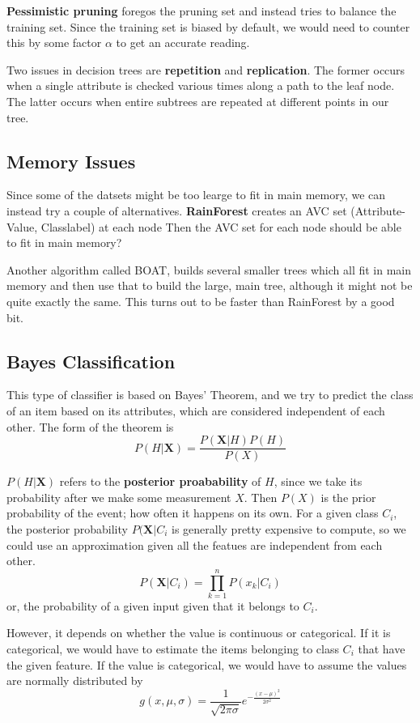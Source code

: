 \documentclass[
  paper=a4,
,captions=tableheading
]{scrartcl}
\begin{document}
\textbf{Pessimistic pruning} foregos the pruning set and instead tries
to balance the training set. Since the training set is biased by
default, we would need to counter this by some factor \(\alpha\) to get
an accurate reading.

Two issues in decision trees are \textbf{repetition} and
\textbf{replication}. The former occurs when a single attribute is
checked various times along a path to the leaf node. The latter occurs
when entire subtrees are repeated at different points in our tree.

\hypertarget{memory-issues}{%
\subsection{Memory Issues}\label{memory-issues}}

Since some of the datsets might be too learge to fit in main memory, we
can instead try a couple of alternatives. \textbf{RainForest} creates an
AVC set (Attribute-Value, Classlabel) at each node Then the AVC set for
each node should be able to fit in main memory?

Another algorithm called BOAT, builds several smaller trees which all
fit in main memory and then use that to build the large, main tree,
although it might not be quite exactly the same. This turns out to be
faster than RainForest by a good bit.

\hypertarget{bayes-classification}{%
\subsection{Bayes Classification}\label{bayes-classification}}

This type of classifier is based on Bayes' Theorem, and we try to
predict the class of an item based on its attributes, which are
considered independent of each other. The form of the theorem is
\begin{equation}
P(H|\mathbf{X}) = \frac{P(\mathbf{X}|H)P(H)}{P(X)}
\end{equation}

\(P(H|\mathbf{X})\) refers to the \textbf{posterior proabability} of
\(H\), since we take its probability after we make some measurement
\(X\). Then \(P(X)\) is the prior probability of the event; how often it
happens on its own. For a given class \(C_{i}\), the posterior
probability \(P(\mathbf{X}|C_{i}\) is generally pretty expensive to
compute, so we could use an approximation given all the featues are
independent from each other. \begin{equation}
P(\mathbf{X}|C_{i}) = \prod_{k=1}^{n}P(x_{k}|C_{i})
\end{equation} or, the probability of a given input given that it
belongs to \(C_{i}\).

However, it depends on whether the value is continuous or categorical.
If it is categorical, we would have to estimate the items belonging to
class \(C_{i}\) that have the given feature. If the value is
categorical, we would have to assume the values are normally distributed
by \begin{equation}
g(x,\mu,\sigma) = \frac{1}{\sqrt{2\pi\sigma}}e^{-\frac{(x-\mu)^{2}}{2\sigma^{2}}}
\end{equation}
\end{document}
